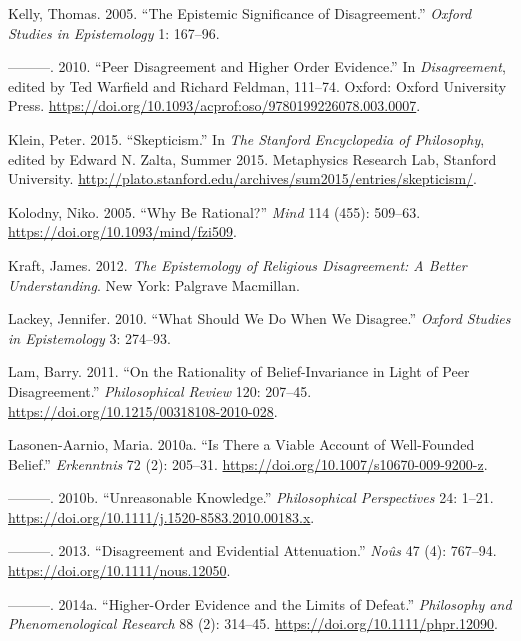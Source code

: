 \documentclass[
  10pt,
  letterpaper,
  twoside]{scrbook}
\newlength{\cslhangindent}
\newenvironment{CSLReferences}[2] %
 {\begin{list}{}{%
  \setlength{\itemindent}{0pt}
  \setlength{\leftmargin}{0pt}
  \setlength{\parsep}{0pt}
  \ifodd #1
   \setlength{\leftmargin}{\cslhangindent}
   \setlength{\itemindent}{-1\cslhangindent}
  \fi
  \setlength{\itemsep}{#2\baselineskip}}}
 {\end{list}}
\begin{document}
\begin{CSLReferences}{1}{0}
Kelly, Thomas. 2005. {``The Epistemic Significance of Disagreement.''}
\emph{Oxford Studies in Epistemology} 1: 167--96.

---------. 2010. {``Peer Disagreement and Higher Order Evidence.''} In
\emph{Disagreement}, edited by Ted Warfield and Richard Feldman,
111--74. Oxford: Oxford University Press.
\url{https://doi.org/10.1093/acprof:oso/9780199226078.003.0007}.

Klein, Peter. 2015. {``Skepticism.''} In \emph{The Stanford Encyclopedia
of Philosophy}, edited by Edward N. Zalta, Summer 2015. Metaphysics
Research Lab, Stanford University.
\url{http://plato.stanford.edu/archives/sum2015/entries/skepticism/}.

Kolodny, Niko. 2005. {``Why Be Rational?''} \emph{Mind} 114 (455):
509--63. \url{https://doi.org/10.1093/mind/fzi509}.

Kraft, James. 2012. \emph{The Epistemology of Religious Disagreement: A
Better Understanding}. New York: Palgrave Macmillan.

Lackey, Jennifer. 2010. {``What Should We Do When We Disagree.''}
\emph{Oxford Studies in Epistemology} 3: 274--93.

Lam, Barry. 2011. {``On the Rationality of Belief-Invariance in Light of
Peer Disagreement.''} \emph{Philosophical Review} 120: 207--45.
\url{https://doi.org/10.1215/00318108-2010-028}.

Lasonen-Aarnio, Maria. 2010a. {``Is There a Viable Account of
Well-Founded Belief.''} \emph{Erkenntnis} 72 (2): 205--31.
\url{https://doi.org/10.1007/s10670-009-9200-z}.

---------. 2010b. {``Unreasonable Knowledge.''} \emph{Philosophical
Perspectives} 24: 1--21.
\url{https://doi.org/10.1111/j.1520-8583.2010.00183.x}.

---------. 2013. {``Disagreement and Evidential Attenuation.''}
\emph{No{û}s} 47 (4): 767--94. \url{https://doi.org/10.1111/nous.12050}.

---------. 2014a. {``Higher-Order Evidence and the Limits of Defeat.''}
\emph{Philosophy and Phenomenological Research} 88 (2): 314--45.
\url{https://doi.org/10.1111/phpr.12090}.


\end{CSLReferences}
\end{document}
